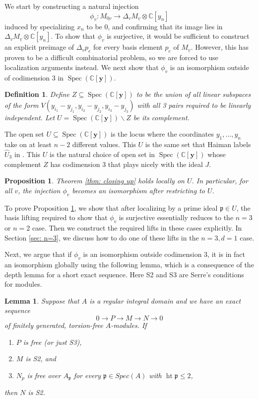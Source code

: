 \documentclass[submission]{FPSAC2027}
\newcommand{\C}{\mathbb{C}}
\DeclareMathOperator{\height}{ht}
\DeclareMathOperator{\spec}{Spec}
\newcommand{\uv}{\underline{v}}
\newcommand{\uov}{\underline{0v}}
\newcommand{\Y}{\C[\mathbf{y}]}
\newcommand{\fp}{\mathfrak{p}}
\newtheorem{lem}[thm]{Lemma}
\newtheorem{defn}[thm]{Definition}
\newtheorem{prop}[thm]{Proposition}
\begin{document}
We start by constructing a natural injection
$$\phi_v : M_{\uov} \rightarrow \Delta_v M_{\uv} \otimes \C[y_n]$$ induced by specializing $x_n$ to be 0, and confirming that its image lies in $\Delta_v M_{\uv} \otimes \C[y_n]$. To show that $\phi_v$ is surjective, it would be sufficient to construct an explicit preimage of $\Delta_v p_e$ for every basis element $p_e$ of $M_{\uv}$. However, this has proven to be a difficult combinatorial problem, so we are forced to use localization arguments instead. We next show that $\phi_v$ is an isomorphism outside of codimension $3$ in $\spec(\Y)$.

\begin{defn}
    Define $Z \subseteq \spec(\Y)$ to be the union of all linear subspaces of the form $V(y_{i_1} - y_{j_1}, y_{i_2} - y_{j_2}, y_{i_3} - y_{j_3})$ with all 3 pairs required to be linearly independent. Let $U = \spec(\Y) \backslash Z$ be its complement.
\end{defn}
The open set $U \subseteq \spec(\Y)$ is the locus where the coordinates $y_1, \dots, y_n$ take on at least $n-2$ different values. This $U$ is the same set that Haiman labels $\hat{U}_3$ in \cite[Definition 4.4.1]{Haiman}. This $U$ is the natural choice of open set in $\spec(\Y)$ whose complement $Z$ has codimension 3 that plays nicely with the ideal $J$.
\begin{prop}
    \label{prop: local closing up}
    Theorem \ref{thm: closing up} holds locally on $U$. In particular, for all $v$, the injection $\phi_v$ becomes an isomorphism after restricting to $U$.
\end{prop}

To prove Proposition \ref{prop: local closing up}, we show that after localizing by a prime ideal $\fp \in U$, the basis lifting required to show that $\phi_v$ is surjective essentially reduces to the $n=3$ or $n=2$ case. Then we construct the required lifts in these cases explicitly. In Section \ref{sec: n=3}, we discuss how to do one of these lifts in the $n=3, d=1$ case.

Next, we argue that if $\phi_v$ is an isomorphism outside codimension 3, it is in fact an isomorphism globally using the following lemma, which is a consequence of the depth lemma for a short exact sequence. Here S2 and S3 are Serre's conditions for modules.

\begin{lem}
    \label{lem: reflexive SES}
    Suppose that $A$ is a regular integral domain and we have an exact sequence
    $$0 \rightarrow P \rightarrow M \rightarrow N \rightarrow 0$$
    of finitely generated, torsion-free $A$-modules. If
    \begin{enumerate}
        \item $P$ is free (or just S3),
        \item $M$ is S2, and
        \item $N_p$ is free over $A_{\fp}$ for every $\fp \in Spec(A)$ with $\height \fp \leq 2$,
    \end{enumerate}
    then $N$ is S2.
\end{lem}
\end{document}
